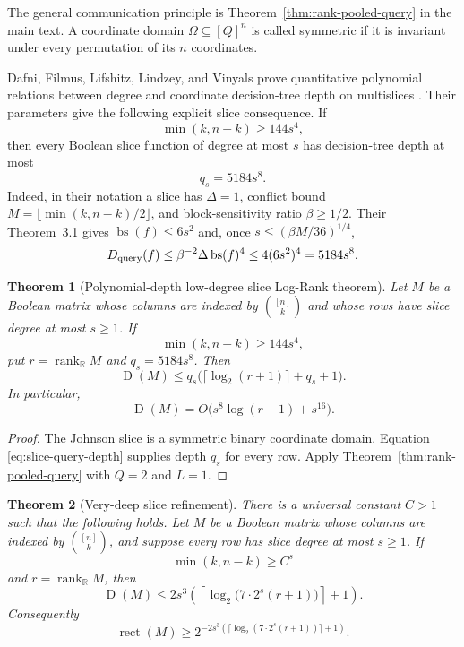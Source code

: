 \documentclass[11pt]{article}
\newtheorem{theorem}{Theorem}[section]
\theoremstyle{definition}
\theoremstyle{remark}
\newcommand{\R}{\mathbb R}
\newcommand{\1}{\mathbf 1}
\newcommand{\rank}{\operatorname{rank}}
\newcommand{\rect}{\operatorname{rect}}
\newcommand{\Dcc}{\operatorname{D}}
\begin{document}
The general communication principle is Theorem~\ref{thm:rank-pooled-query} in the main text.  A coordinate domain
$\Omega\subseteq[Q]^n$ is called symmetric if it is invariant under every
permutation of its $n$ coordinates.

Dafni, Filmus, Lifshitz, Lindzey, and Vinyals prove quantitative polynomial
relations between degree and coordinate decision-tree depth on multislices
\cite{DafniFilmusLifshitzLindzeyVinyals}.  Their parameters give the following
explicit slice consequence.  If
\[
 \min(k,n-k)\ge144s^4,
\]
then every Boolean slice function of degree at most $s$ has decision-tree
depth at most
\begin{equation}\label{eq:slice-query-depth}
 q_s=5184s^8.
\end{equation}
Indeed, in their notation a slice has $\Delta=1$, conflict bound
$M=\lfloor\min(k,n-k)/2\rfloor$, and block-sensitivity ratio
$\beta\ge1/2$.  Their Theorem~3.1 gives
$\operatorname{bs}(f)\le6s^2$ and, once
$s\le(\beta M/36)^{1/4}$,
\[
 D_{\rm query}(f)
 \le\beta^{-2}\Delta\operatorname{bs}(f)^4
 \le4(6s^2)^4=5184s^8.
\]

\begin{theorem}[Polynomial-depth low-degree slice Log-Rank theorem]
\label{thm:polynomial-depth-slice}
Let $M$ be a Boolean matrix whose columns are indexed by $\binom{[n]}k$ and
whose rows have slice degree at most $s\ge1$.  If
\[
 \min(k,n-k)\ge144s^4,
\]
put $r=\rank_{\R}M$ and $q_s=5184s^8$.  Then
\[
 \Dcc(M)\le
 q_s\bigl(\lceil\log_2(r+1)\rceil+q_s+1\bigr).
\]
In particular,
\[
 \Dcc(M)=O\bigl(s^8\log(r+1)+s^{16}\bigr).
\]
\end{theorem}

\begin{proof}
The Johnson slice is a symmetric binary coordinate domain.  Equation
\eqref{eq:slice-query-depth} supplies depth $q_s$ for every row.  Apply
Theorem~\ref{thm:rank-pooled-query} with $Q=2$ and $L=1$.
\end{proof}

\begin{theorem}[Very-deep slice refinement]
\label{thm:low-degree-slice}
There is a universal constant $C>1$ such that the following holds.  Let $M$
be a Boolean matrix whose columns are indexed by $\binom{[n]}k$, and suppose
every row has slice degree at most $s\ge1$.  If
\[
 \min(k,n-k)\ge C^s
\]
and $r=\rank_{\R}M$, then
\[
 \Dcc(M)\le
 2s^3\left(
 \left\lceil\log_2\bigl(7\cdot2^s(r+1)\bigr)\right\rceil+1
 \right).
\]
Consequently
\[
 \rect(M)\ge
 2^{-2s^3(\lceil\log_2(7\cdot2^s(r+1))\rceil+1)}.
\]
\end{theorem}
\end{document}
